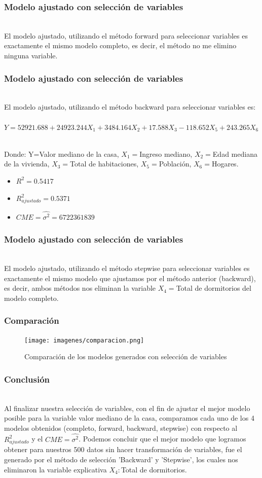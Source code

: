 \documentclass[12pt]{beamer}
\begin{document}
\begin{frame}
\frametitle{Modelo ajustado con selección de variables}
~\\ El modelo ajustado, utilizando el método forward para seleccionar variables es exactamente el mismo modelo completo, es decir, el método no me elimino ninguna variable.
\end{frame}

\begin{frame}
\frametitle{Modelo ajustado con selección de variables}
~\\ El modelo ajustado, utilizando el método backward para seleccionar variables es:
~\\ $Y=52921.688+24923.244X_{1}+3484.164X_{2}+17.588X_{3}-118.652X_{5}+243.265X_{6}$

~\\ Donde: Y=Valor mediano de la casa, $X_{1}=$Ingreso mediano, $X_{2}=$Edad mediana de la vivienda, $X_{3}=$Total de habitaciones, $X_{5}=$Población, $X_{6}=$Hogares.
\begin{itemize}
\item $R^2=0.5417$
\item $R^2_{ajustado}=0.5371$
\item $CME=\hat{\sigma^2}=6722361839$
\end{itemize}
\end{frame}

\begin{frame}
\frametitle{Modelo ajustado con selección de variables}
~\\ El modelo ajustado, utilizando el método stepwise para seleccionar variables es  exactamente el mismo modelo que ajustamos por el método anterior (backward), es decir, ambos métodos nos eliminan la variable $X_{4}=$Total de dormitorios del modelo completo.
\end{frame}

\begin{frame}
\frametitle{Comparación}
\begin{figure}[!h]
    \begin{center}
        \texttt{[image: imagenes/comparacion.png]}
        \caption{Comparación de los modelos generados con selección de variables}
        \label{fig:Densidad}
    \end{center}
\end{figure}
\end{frame}

\begin{frame}
\frametitle{Conclusión}
~\\ Al finalizar nuestra selección de variables, con el fin de ajustar el mejor modelo posible para la variable valor mediano de la casa, comparamos cada uno de los 4 modelos obtenidos (completo, forward, backward, stepwise) con respecto al $R^2_{ajustado}$ y el $CME=\hat{\sigma^2}$. Podemos concluir que el mejor modelo que logramos obtener  para nuestros 500 datos sin hacer transformación de variables, fue el generado por el método de selección 'Backward'      y 'Stepwise', los cuales nos eliminaron la variable explicativa $X_{4}:$Total de dormitorios.
\end{frame}
\end{document}
